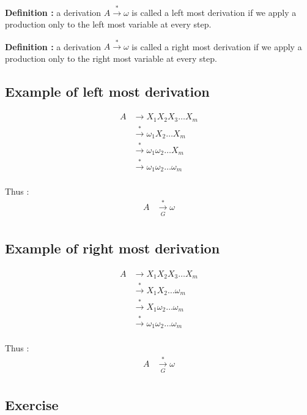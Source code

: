 \documentclass[12pt]{book}
\begin{document}
\textbf{Definition : } a derivation $A \xrightarrow{*} \omega$ is called a left most derivation if we apply a production only to the left most variable at every step.

\textbf{Definition : } a derivation $A \xrightarrow{*} \omega$ is called a right most derivation if we apply a production only to the right most variable at every step.

\subsection{Example of left most derivation}

\begin{align*}
A &\xrightarrow{} X_{1}X_{2}X_{3} \dots X_{m} \\
&\xrightarrow{*} \omega_{1} X_{2} \dots X_{m} \\
&\xrightarrow{*} \omega_{1} \omega_{2} \dots X_{m} \\
&\xrightarrow{*} \omega_{1} \omega_{2} \dots \omega_{m} \\
\end{align*}

Thus :
\begin{align*}
A &\xrightarrow[G]{*} \omega \\
\end{align*}

\subsection{Example of right most derivation}

\begin{align*}
A &\xrightarrow{} X_{1}X_{2}X_{3} \dots X_{m} \\
&\xrightarrow{*} X_{1} X_{2} \dots \omega_{m} \\
&\xrightarrow{*} X_{1} \omega_{2} \dots \omega_{m} \\
&\xrightarrow{*} \omega_{1} \omega_{2} \dots \omega_{m} \\
\end{align*}

Thus :
\begin{align*}
A &\xrightarrow[G]{*} \omega \\
\end{align*}


\subsection{Exercise}
\end{document}
